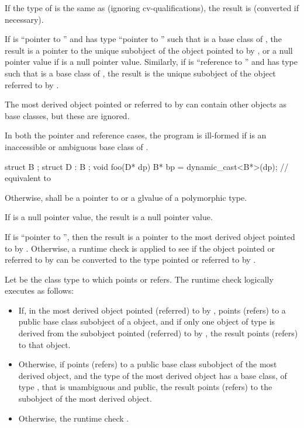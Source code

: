 \pnum
If the type of  is the same as  (ignoring cv-qualifications),
the result is
 (converted if necessary).

\pnum
If  is ``pointer to  '' and  has
type ``pointer to  '' such that  is a base
class of , the result is a pointer to the unique 
subobject of the  object pointed to by , or
a null pointer value if  is a null pointer value.
Similarly, if
 is ``reference to  '' and  has
type   such that  is a base class of
, the result is the unique  subobject of the 
object referred to by .
\begin{footnote}
The most derived
object pointed or referred to by
 can contain other  objects as base classes, but these
are ignored.
\end{footnote}
In both the pointer and
reference cases, the program is ill-formed if  is an inaccessible or
ambiguous base class of .
\begin{example}
\begin{codeblock}
struct B { };
struct D : B { };
void foo(D* dp) {
  B*  bp = dynamic_cast<B*>(dp);    // equivalent to 
}
\end{codeblock}
\end{example}

\pnum
Otherwise,  shall be a pointer to or a glvalue of a polymorphic
type.

\pnum
If  is a null pointer value, the result is a null pointer value.

\pnum
If  is ``pointer to \cv{} '', then the result
is a pointer to the most derived object pointed to by .
Otherwise, a runtime check is applied to see if the object pointed or
referred to by  can be converted to the type pointed or
referred to by .

\pnum
Let  be the class type to which  points or refers. The runtime
check logically executes as follows:

\begin{itemize}
\item If, in the most derived object pointed (referred) to by ,
 points (refers) to a public base class subobject of a
 object, and if only one object of type  is derived
from the subobject pointed (referred) to by ,
the result points (refers) to that  object.

\item Otherwise, if  points (refers) to a public base
class subobject of the most derived object, and the type of the most
derived object has a base class, of type , that is unambiguous
and public, the result points (refers) to the
 subobject of the most derived object.

\item Otherwise, the
runtime check .
\end{itemize}

